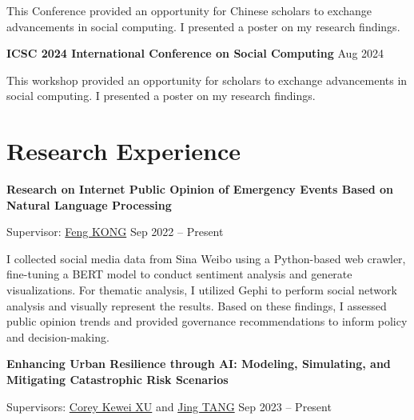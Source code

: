 \documentclass[letterpaper, 11pt]{article}
\begin{document}
This Conference provided an opportunity for Chinese scholars to exchange advancements in social computing. I presented a poster on my research findings.

\vspace{0.5em}
\textbf{ICSC 2024 International Conference on Social Computing} \hfill Aug 2024

This workshop provided an opportunity for scholars to exchange advancements in social computing. I presented a poster on my research findings.

\section{Research Experience}
\textbf{Research on Internet Public Opinion of Emergency Events Based on Natural Language Processing}

Supervisor: \href{https://cohd.cau.edu.cn/art/2020/11/27/art_48059_998984.html}{Feng KONG} \hfill Sep 2022 -- Present

I collected social media data from Sina Weibo using a Python-based web crawler, fine-tuning a BERT model to conduct sentiment analysis and generate visualizations. For thematic analysis, I utilized Gephi to perform social network analysis and visually represent the results. Based on these findings, I assessed public opinion trends and provided governance recommendations to inform policy and decision-making.

\vspace{0.5em}
\textbf{Enhancing Urban Resilience through AI: Modeling, Simulating, and Mitigating Catastrophic Risk Scenarios}

Supervisors: \href{https://facultyprofiles.hkust-gz.edu.cn/faculty-personal-page/XU-Kewei/coreyxu}{Corey Kewei XU} and \href{https://facultyprofiles.hkust-gz.edu.cn/faculty-personal-page/TANG-Jing/jingtang}{Jing TANG} \hfill Sep 2023 -- Present
\end{document}
